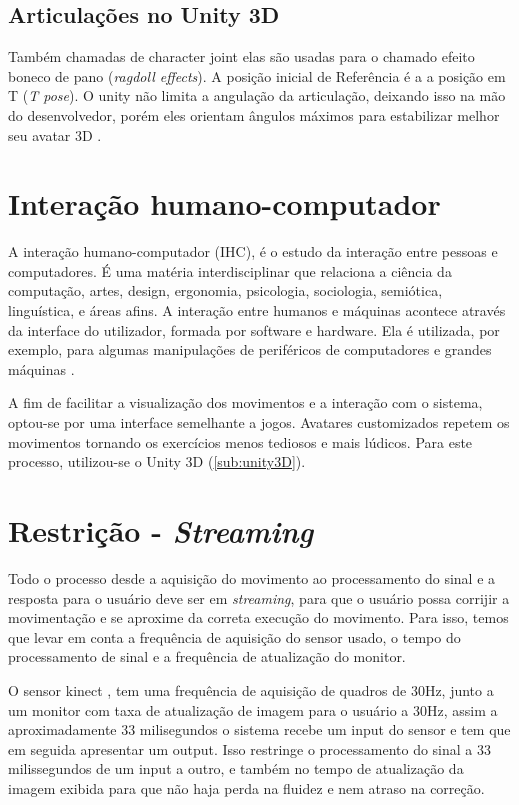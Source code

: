 \begin{table}[H]
\begin{tabular}{|c|c|c|}
   \end{tabular}
   \end{table}


  \subsection{Articulações no Unity 3D}
  \label{sec:Articulacoes no Unity 3D}
    Também chamadas de character joint elas são usadas para o chamado efeito
  boneco de pano (\textit{ragdoll effects}). A posição inicial de Referência é a
  a posição em T (\textit{T pose}). O unity não limita a angulação da articulação,
  deixando isso na mão do desenvolvedor, porém eles orientam ângulos máximos
  para estabilizar melhor seu avatar 3D \cite{unity3DManual}.


  \section{Interação humano-computador}
  \label{sec:ihc}
  A interação humano-computador (IHC), é o estudo da interação entre pessoas e computadores.
  É uma matéria interdisciplinar que relaciona a ciência da computação,
  artes, design, ergonomia, psicologia, sociologia, semiótica, linguística, e áreas afins.
  A interação entre humanos e máquinas acontece através da interface do utilizador,
  formada por software e hardware. Ela é utilizada, por exemplo, para algumas manipulações
  de periféricos de computadores e grandes máquinas \cite{ihc}.

  A fim de facilitar a visualização dos movimentos e a interação com o sistema, optou-se por uma interface semelhante a jogos.
  Avatares customizados repetem os movimentos tornando os exercícios menos tediosos e mais lúdicos. Para este processo, utilizou-se
  o Unity 3D (\ref{sub:unity3D}).

  \section{Restrição - \textit{Streaming}}
  \label{sec:restrição}
    Todo o processo desde a aquisição do movimento ao processamento do sinal e a
  resposta para o usuário  deve ser em \textit{streaming}, para que o usuário possa corrijir a movimentação e se
  aproxime da correta execução do movimento. Para isso, temos que levar em conta
  a frequência de aquisição do sensor usado, o tempo do processamento de sinal e
  a frequência de atualização do monitor.

    O sensor kinect \cite{microsoftResearch}, tem uma frequência de
  aquisição de quadros de 30Hz, junto a um monitor com taxa de atualização de imagem
  para o usuário a 30Hz, assim a aproximadamente 33 milisegundos o
  sistema recebe um input do sensor e tem que em seguida apresentar um output. Isso
   restringe o processamento do sinal a 33 milissegundos de um input a outro, e
  também no tempo de atualização da imagem exibida para que não haja perda na
  fluidez e nem atraso na correção.


